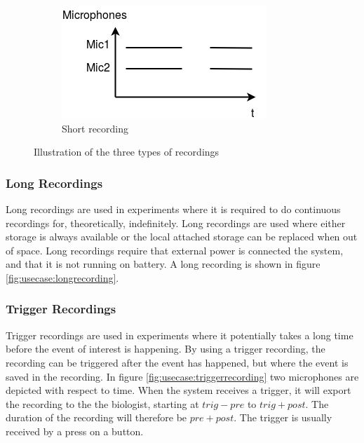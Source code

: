 \begin{figure}[H]
    \begin{subfigure}[b]{0.3\textwidth}
        \includegraphics[width=\textwidth]{figures/recording_short.png}
        \caption{Short recording}
        \label{fig:usecase:shortrecording}
    \end{subfigure}
    \caption{Illustration of the three types of recordings}\label{fig:usecase:recordingtypes}
\end{figure}
\subsubsection{Long Recordings}\label{sec:usecase:longrecording}
Long recordings are used in experiments where it is required to do continuous recordings for, theoretically, indefinitely. Long recordings are used where either storage is always available or the local attached storage can be replaced when out of space. Long recordings require that external power is connected the system, and that it is not running on battery. A long recording is shown in figure \ref{fig:usecase:longrecording}.

\subsubsection{Trigger Recordings}\label{sec:usecase:triggerrecording}
Trigger recordings are used in experiments where it potentially takes a long time before the event of interest is happening. By using a trigger recording, the recording can be triggered after the event has happened, but where the event is saved in the recording. In figure \ref{fig:usecase:triggerrecording} two microphones are depicted with respect to time. When the system receives a trigger, it will export the recording to the the biologist, starting at $trig-pre$ to $trig+post$. The duration of the recording will therefore be $pre+post$. The trigger is usually received by a press on a button.

